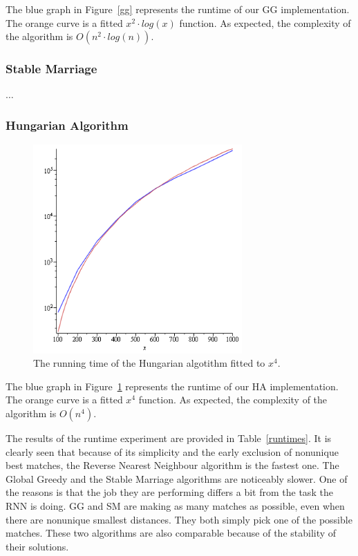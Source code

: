 \documentclass[a4paper,11pt]{article}
\begin{document}
The blue graph in Figure~\ref{gg} represents the runtime of our GG implementation. The orange curve is a fitted $x^2 \cdot log(x)$ function. As expected, the complexity of the algorithm is $O(n^{2} \cdot log(n))$.

\subsubsection{Stable Marriage}

$\dots$

\subsubsection{Hungarian Algorithm}

\begin{figure}[ht!]
\centering 
\includegraphics[width=80mm]{HA_runtime.png}
\caption{The running time of the Hungarian algotithm fitted to $x^4$.}
\label{hung} 
\end{figure}

The blue graph in Figure~\ref{hung} represents the runtime of our HA implementation. The orange curve is a fitted $x^4$ function. As expected, the complexity of the algorithm is $O(n^{4})$.

The results of the runtime experiment are provided in Table~\ref{runtimes}. It is clearly seen that because of its simplicity and the early exclusion of nonunique best matches, the Reverse Nearest Neighbour algorithm is the fastest one. The Global Greedy and the Stable Marriage algorithms are noticeably slower. One of the reasons is that the job they are performing differs a bit from the task the RNN is doing. GG and SM are making as many matches as possible, even when there are nonunique smallest distances. They both simply pick one of the possible matches. These two algorithms are also comparable because of the stability of their solutions.
\end{document}
